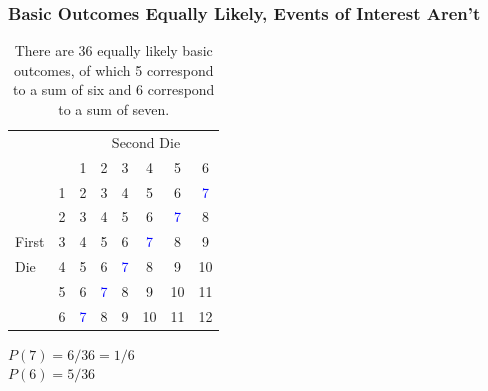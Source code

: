 \documentclass[handout]{beamer}
\begin{document}
\begin{frame}
\frametitle{Basic Outcomes Equally Likely, Events of Interest Aren't}

\begin{table}
	\begin{tabular}{|lr|cccccc|}
	\hline
	&&\multicolumn{6}{|c|}{Second Die}\\
	&&1&2&3&4&5&6\\
	\hline
	&1&2&3&4&5&\alert{6}&\textcolor{blue}{7}\\
	&2&3&4&5&\alert{6}&\textcolor{blue}{7}&8\\
	First&3&4&5&\alert{6}&\textcolor{blue}{7}&8&9\\
	Die&4&5&\alert{6}&\textcolor{blue}{7}&8&9&10\\
	&5&\alert{6}&\textcolor{blue}{7}&8&9&10&11\\
	&6&\textcolor{blue}{7}&8&9&10&11&12\\
	\hline
	\end{tabular}
	\caption{There are 36 equally likely basic outcomes, of which 5 correspond to a sum of six and 6 correspond to a sum of  seven.}
\end{table}
	\alert{$P(7) = 6/36 = 1/6$}\\
	\alert{$P(6) = 5/36$}
\end{frame}

\end{document}
